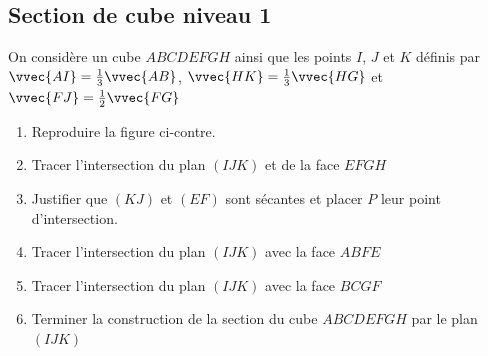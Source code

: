 \documentclass[oneside,12pt]{book}          %
\begin{document}
\subsection{Section de cube niveau 1}
\begin{minipage}{0.3\linewidth}
\end{minipage}\hfill
\begin{minipage}{0.65\linewidth}
On considère un cube $ABCDEFGH$ ainsi que les points $I$, $J$ et $K$ définis par $\vvec{AI}=\frac{1}{3}\vvec{AB}$, $\vvec{HK}=\frac{1}{3}\vvec{HG}$ et $\vvec{FJ}=\frac{1}{2}\vvec{FG}$
\begin{enumerate}
	\item Reproduire la figure ci-contre.
	\item Tracer l'intersection du plan $(IJK)$ et de la face $EFGH$
	\item Justifier que $(KJ)$ et $(EF)$ sont sécantes et placer $P$ leur point d'intersection.
	\item Tracer l'intersection du plan $(IJK)$ avec la face $ABFE$
	\item Tracer l'intersection du plan $(IJK)$ avec la face $BCGF$
	\item Terminer la construction de la section du cube $ABCDEFGH$ par le plan $(IJK)$
\end{enumerate}

\end{minipage}
\end{document}

